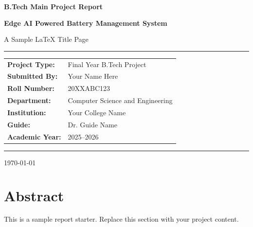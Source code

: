 \documentclass[12pt,a4paper]{article}
\begin{document}
\begin{titlepage}
	\centering
	\vspace*{1cm}

	{\Large \textbf{B.Tech Main Project Report}\par}
	\vspace{1.5cm}

	{\Huge \bfseries Edge AI Powered Battery Management System\par}
	\vspace{1.2cm}

	{\large A Sample LaTeX Title Page\par}
	\vspace{2cm}

	\rule{0.8\textwidth}{0.6pt}
	\vspace{1.5cm}

	\begin{tabular}{>{\bfseries}p{5cm} p{8cm}}
		Project Type: & Final Year B.Tech Project \\
		Submitted By: & Your Name Here \\
		Roll Number: & 20XXABC123 \\
		Department: & Computer Science and Engineering \\
		Institution: & Your College Name \\
		Guide: & Dr. Guide Name \\
		Academic Year: & 2025--2026 \\
	\end{tabular}

	\vfill

	\rule{0.8\textwidth}{0.6pt}
	\vspace{0.8cm}

	{\large \today\par}
\end{titlepage}

\section*{Abstract}
This is a sample report starter. Replace this section with your project content.
\end{document}

